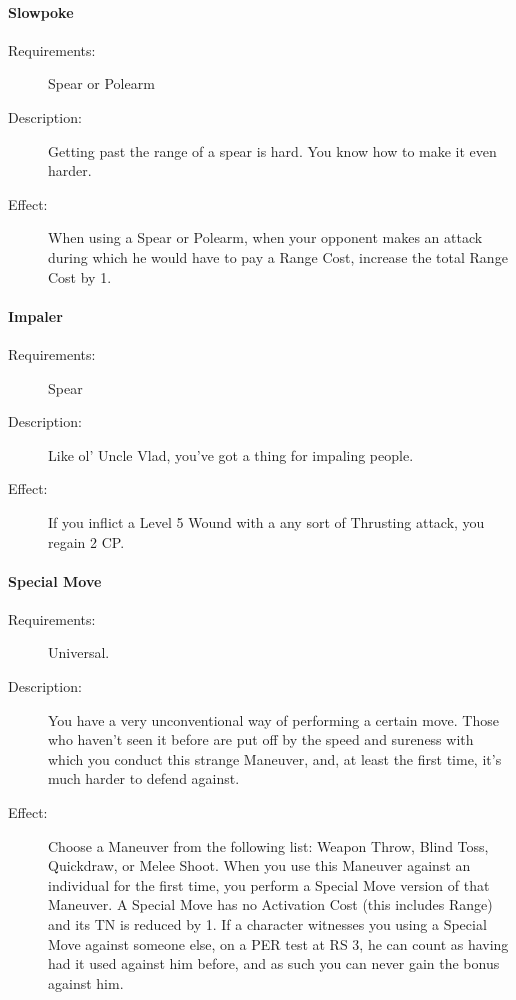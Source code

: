 \documentclass[oneside,11pt,english]{book}
\begin{document}
\paragraph{\label{talent:Slowpoke}Slowpoke}
\begin{description}
	\item [Requirements:] Spear or Polearm 
	\item [Description:] Getting past the range of a spear is hard. You know how to make it even harder.
	\item [Effect:] When using a Spear or Polearm, when your opponent makes an attack during which he would 
	have to pay a Range Cost, increase the total Range Cost by 1. 
	
\end{description}
\paragraph{\label{talent:Impaler}Impaler}
\begin{description}
	\item [Requirements:] Spear 
	\item [Description:] Like ol’ Uncle Vlad, you’ve got a thing for impaling people. 
	\item [Effect:] If you inflict a Level 5 Wound with a any sort of Thrusting attack, you regain 2 CP. 
	
\end{description}
\paragraph{\label{talent:Special Move}Special Move}
\begin{description}
	\item [Requirements:] Universal. 
	\item [Description:] You have a very unconventional way of performing a certain move. Those who haven't seen 
	it before are put off by the speed and sureness with which you conduct this strange Maneuver, and, at 
	least the first time, it's much harder to defend against. 
	\item [Effect:] Choose a Maneuver from the following list: Weapon Throw, Blind Toss, Quickdraw, or Melee Shoot. When you use this Maneuver against an individual for the first time, you perform a Special Move 
	version of that Maneuver. A Special Move has no Activation Cost (this includes Range) and its TN is 
	reduced by 1. If a character witnesses you using a Special Move against someone else, on a PER test at 
	RS 3, he can count as having had it used against him before, and as such you can never gain the bonus 
	against him. 
	
\end{description}
\end{document}

